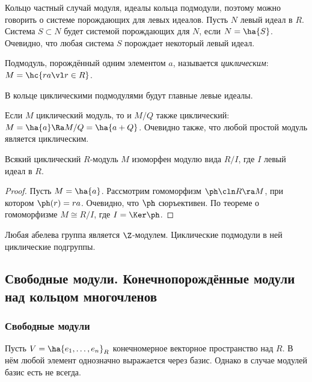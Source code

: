 \documentclass[a4paper]{article}
\begin{document}
Кольцо частный случай модуля, идеалы кольца подмодули, поэтому можно говорить о системе  порождающих
для левых идеалов. Пусть $N$ левый идеал в $R$. Система $S \subset N$ будет системой порождающих для $N$,
если $N=\ha{S}$. Очевидно, что любая система $S$ порождает некоторый левый идеал.

\begin{df}
Подмодуль, порождённый одним элементом $a$, называется \emph{циклическим}: $M=\hc{ra \vl r \in R}$.
\end{df}

\begin{ex}
В кольце циклическими подмодулями будут главные левые идеалы.
\end{ex}

Если $M$ циклический модуль, то и $M/Q$ также циклический: $M=\ha{a} \Ra M/Q=\ha{a+Q}$.  Очевидно
также, что любой простой модуль является циклическим.

\begin{theorem}
Всякий циклический $R$-модуль $M$ изоморфен модулю вида $R/I$, где $I$ левый идеал в $R$.
\end{theorem}
\begin{proof}
Пусть $M=\ha{a}$. Рассмотрим гомоморфизм $\ph\cln R\ra M$, при котором $\ph(r)=ra$. Очевидно, что $\ph$
сюръективен. По теореме о гомоморфизме $M \cong R/I$, где $I=\Ker \ph$.
\end{proof}

\begin{ex}
Любая абелева группа является $\Z$-модулем. Циклические подмодули в ней циклические подгруппы.
\end{ex}

\subsection{Свободные модули. Конечнопорождённые модули над кольцом многочленов}

\subsubsection{Свободные модули}

Пусть $V=\ha{e_1,\ldots,e_n}_R$ конечномерное векторное пространство над $R$. В нём любой  элемент
однозначно выражается через базис. Однако в случае модулей базис есть не всегда.
\end{document}
